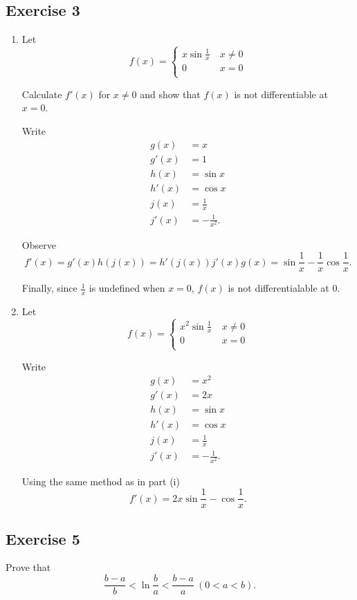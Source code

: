 \documentclass{tufte-book}
\theoremstyle{mytheoremstyle}
\theoremstyle{mylemstyle}
\theoremstyle{mydefstyle}
\begin{document}
\subsection{Exercise 3}
\begin{enumerate}

\item Let
\[ f(x) =
\begin{cases}
x \sin \frac{1}{x} & \ x \neq 0 \\
0 & \ x = 0\\
\end{cases}
\]

Calculate $f'(x)$ for $x \neq 0$ and show that $f(x)$ is not differentiable at $x=0$.

Write
\begin{align*}
g(x) &= x\\
g'(x) &= 1\\
h(x) &= \sin x\\
h'(x) &= \cos x\\
j(x) &= \frac{1}{x}\\
j'(x) &= -\frac{1}{x^2}.
\end{align*}

Observe
\[ f'(x) = g'(x)h(j(x)) = h'(j(x))j'(x)g(x) = \sin \frac{1}{x} - \frac{1}{x} \cos \frac{1}{x}. \]

Finally, since $\frac{1}{x}$ is undefined when $x=0$, $f(x)$ is not differentialable at $0$.

\item Let
\[ f(x) =
\begin{cases}
x^2 \sin \frac{1}{x} & \ x \neq 0 \\
0 & \ x = 0\\
\end{cases}
\]

Write
\begin{align*}
g(x) &= x^2\\
g'(x) &= 2x\\
h(x) &= \sin x\\
h'(x) &= \cos x\\
j(x) &= \frac{1}{x}\\
j'(x) &= -\frac{1}{x^2}.
\end{align*}

Using the same method as in part (i)
\[f'(x) = 2x \sin \frac{1}{x} - \cos\frac{1}{x} . \]

\end{enumerate}

\subsection{Exercise 5}
Prove that
\[ \frac{b-a}{b} < \ln\frac{b}{a} < \frac{b-a}{a} \ (0<a<b).\]
\end{document}

